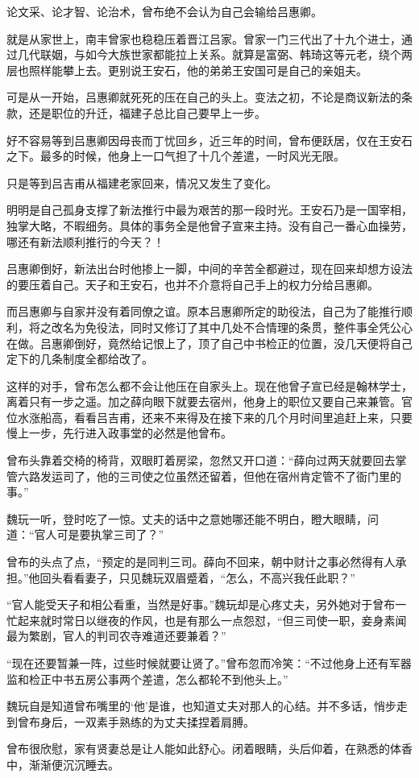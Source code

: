 论文采、论才智、论治术，曾布绝不会认为自己会输给吕惠卿。

就是从家世上，南丰曾家也稳稳压着晋江吕家。曾家一门三代出了十九个进士，通过几代联姻，与如今大族世家都能拉上关系。就算是富弼、韩琦这等元老，绕个两层也照样能攀上去。更别说王安石，他的弟弟王安国可是自己的亲姐夫。

可是从一开始，吕惠卿就死死的压在自己的头上。变法之初，不论是商议新法的条款，还是职位的升迁，福建子总比自己要早上一步。

好不容易等到吕惠卿因母丧而丁忧回乡，近三年的时间，曾布便跃居，仅在王安石之下。最多的时候，他身上一口气担了十几个差遣，一时风光无限。

只是等到吕吉甫从福建老家回来，情况又发生了变化。

明明是自己孤身支撑了新法推行中最为艰苦的那一段时光。王安石乃是一国宰相，独掌大略，不暇细务。具体的事务全是他曾子宣来主持。没有自己一番心血操劳，哪还有新法顺利推行的今天？！

吕惠卿倒好，新法出台时他掺上一脚，中间的辛苦全都避过，现在回来却想方设法的要压着自己。天子和王安石，也并不介意将自己手上的权力分给吕惠卿。

而吕惠卿与自家并没有着同僚之谊。原本吕惠卿所定的助役法，自己为了能推行顺利，将之改名为免役法，同时又修订了其中几处不合情理的条贯，整件事全凭公心在做。吕惠卿倒好，竟然给记恨上了，顶了自己中书检正的位置，没几天便将自己定下的几条制度全都给改了。

这样的对手，曾布怎么都不会让他压在自家头上。现在他曾子宣已经是翰林学士，离着只有一步之遥。加之薛向眼下就要去宿州，他身上的职位又要自己来兼管。官位水涨船高，看看吕吉甫，还来不来得及在接下来的几个月时间里追赶上来，只要慢上一步，先行进入政事堂的必然是他曾布。

曾布头靠着交椅的椅背，双眼盯着房梁，忽然又开口道：“薛向过两天就要回去掌管六路发运司了，他的三司使之位虽然还留着，但他在宿州肯定管不了衙门里的事。”

魏玩一听，登时吃了一惊。丈夫的话中之意她哪还能不明白，瞪大眼睛，问道：“官人可是要执掌三司了？”

曾布的头点了点，“预定的是同判三司。薛向不回来，朝中财计之事必然得有人承担。”他回头看看妻子，只见魏玩双眉蹙着，“怎么，不高兴我任此职？”

“官人能受天子和相公看重，当然是好事。”魏玩却是心疼丈夫，另外她对于曾布一忙起来就时常日以继夜的作风，也是有那么一点怨怼，“但三司使一职，妾身素闻最为繁剧，官人的判司农寺难道还要兼着？”

“现在还要暂兼一阵，过些时候就要让贤了。”曾布忽而冷笑：“不过他身上还有军器监和检正中书五房公事两个差遣，怎么都轮不到他头上。”

魏玩自是知道曾布嘴里的‘他’是谁，也知道丈夫对那人的心结。并不多话，悄步走到曾布身后，一双素手熟练的为丈夫揉捏着肩膊。

曾布很欣慰，家有贤妻总是让人能如此舒心。闭着眼睛，头后仰着，在熟悉的体香中，渐渐便沉沉睡去。


